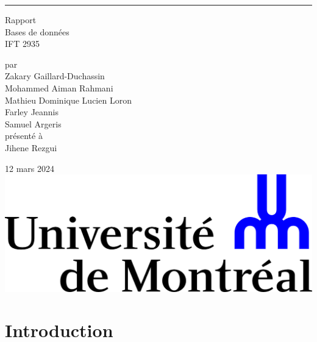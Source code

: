 \documentclass{article}
\begin{document}
\begin{titlepage}
  \centering
  
  \rule{\textwidth}{0px}
  \vspace{15mm}
  
  \Huge{Rapport} \\
  \vspace{5mm}
  \Large Bases de données \\
  IFT 2935
  
  \vspace{40mm}
  \large par \\ \vspace{3mm}
  Zakary Gaillard-Duchassin\\ \vspace{3mm}
  Mohammed Aiman Rahmani \\ \vspace{3mm}
  Mathieu Dominique Lucien Loron \\ \vspace{3mm}
  Farley Jeannis \\ \vspace{3mm}
  Samuel Argeris \\ \vspace{3mm}
  \vspace{30mm}
  présenté à \\ \vspace{3mm}
  Jihene Rezgui
  
  \vfill
  12 mars 2024 \\ \vspace{3mm}
  \includegraphics[scale=0.55]{logo-udem.png}
\end{titlepage}
\newpage

\section{Introduction}

\newpage
\end{document}

